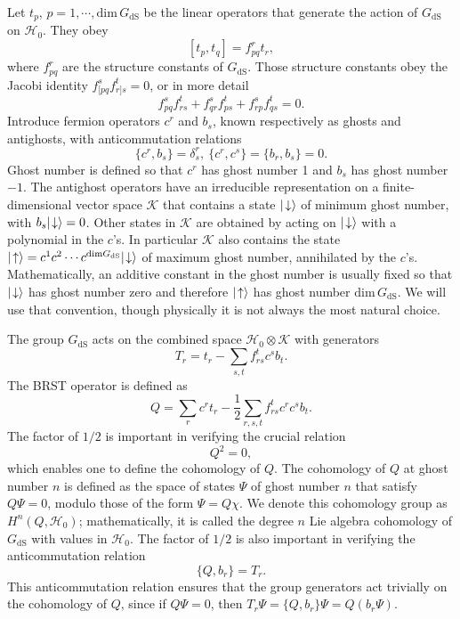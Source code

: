 \documentclass[11pt,a4paper]{article}
\def\dim{{\mathrm{dim}}}
\def\be{\begin{equation}}
\def\ee{\end{equation}}
\def\K{{\mathcal K}}
\def\H{{\mathcal H}}
\def\dS{{\mathrm{dS}}}
\def\ra{\rangle}
\begin{document}
Let $t_p$, $p=1,\cdots, \dim\,G_\dS$ be the linear operators that generate the action of $G_\dS$ on $\H_0$.  They obey 
\be\label{comrels} [t_p,t_q]=f_{pq}^r t_r, \ee
where $f_{pq}^r$ are the structure constants of $G_\dS$.   Those structure constants obey the Jacobi identity $f_{[pq}^s f^t_{r]s}=0$, or in more detail
\be\label{jacobi} f_{pq}^s f^t_{rs} +  f_{qr}^s f^t_{ps}   +f_{rp}^s f^t_{qs}     =0 .\ee
Introduce fermion operators $c^r$ and $b_s$, known respectively as ghosts and antighosts, with anticommutation relations
\be\label{anticom}\{c^r,b_s\}=\delta^r_s, ~\{c^r,c^s\}=\{b_r,b_s\}=0. \ee
Ghost number is defined so that $c^r$ has ghost number 1 and $b_s$ has ghost number $-1$.   The antighost operators have an irreducible representation on
a finite-dimensional vector space $\K$ that contains a state $|\negthinspace\downarrow\ra$ of minimum ghost number, with $b_s|\negthinspace\downarrow\ra=0$. Other
states in $\K$ are obtained by acting on $|\negthinspace\downarrow\ra$ with a polynomial in the $c$'s.  In particular  $\K$  also contains the state $|\negthinspace\uparrow\ra=c^1 c^2\cdots c^{\dim G_\dS}|\negthinspace\downarrow\ra$ of maximum ghost number, annihilated by the $c$'s.   Mathematically, an additive constant in the ghost number is usually fixed so that 
$|\negthinspace\downarrow\ra$ has ghost number zero and therefore $|\negthinspace\uparrow\ra$ has ghost number $\dim\,G_\dS$.   
We will use that convention, though physically it is not always the most natural choice.


The group $G_\dS$ acts on the combined space $\H_0\otimes \K$ with generators
\be\label{newgen}T_r=t_r- \sum_{s,t} f_{rs}^t c^s b_t. \ee
The BRST operator is defined as 
\be\label{brst}Q=\sum_r c^r t_r -\frac{1}{2}\sum_{r,s,t} f_{rs}^t c^r c^s b_t.\ee
The factor of $1/2$ is important in verifying the crucial relation
\be\label{nilp} Q^2=0,\ee
which enables one to define the cohomology of $Q$.   The cohomology of $Q$ at ghost number $n$ is defined as the space of states $\Psi$ of ghost number $n$
that satisfy $Q\Psi=0$, modulo those of the form $\Psi=Q\chi$. We denote this cohomology group as $H^n(Q,\H_0)$;   mathematically, it  is called the degree $n$ Lie algebra cohomology of $G_\dS$ with
values in $\H_0$. The factor of $1/2$ is also important in verifying  the anticommutation relation  
\be\label{anticomm} \{Q,b_r\}=T_r. \ee
This anticommutation relation ensures that the group generators act trivially on the cohomology of $Q$, since if $Q\Psi=0$,
then $T_r\Psi =\{Q,b_r\}\Psi=Q(b_r\Psi)$.    
\end{document}

